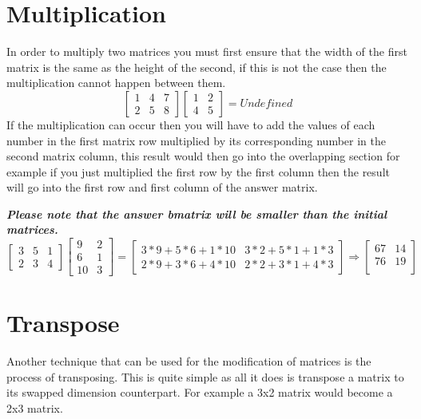 \documentclass{article}
\begin{document}
\section{Multiplication}
In order to multiply two matrices you must first ensure that the width of the first matrix is the same as the height of the second, if this is not the case then the multiplication cannot happen between them.
\begin{equation*}
	\begin{bmatrix}
		1 & 4 & 7\\
		2 & 5 & 8
	\end{bmatrix}
	\begin{bmatrix}
		1 & 2\\
		4 & 5
	\end{bmatrix}
	=
	Undefined
\end{equation*}
If the multiplication can occur then you will have to add the values of each number in the first matrix row multiplied by its corresponding number in the second matrix column, this result would then go into the overlapping section for example if you just multiplied the first row by the first column then the result will go into the first row and first column of the answer matrix.

\textit{\textbf{Please note that the answer bmatrix will be smaller than the initial matrices.}}
\begin{equation*}
	\begin{bmatrix}
		3 & 5 & 1\\
		2 & 3 & 4
	\end{bmatrix}
	\begin{bmatrix}
		9 & 2\\
		6 & 1\\
		10 & 3
	\end{bmatrix}
	=
	\begin{bmatrix}
		3*9+5*6+1*10 & 3*2+5*1+1*3\\
		2*9+3*6+4*10 & 2*2+3*1+4*3
	\end{bmatrix}
	\Rightarrow
	\begin{bmatrix}
		67 & 14\\
		76 & 19\\
	\end{bmatrix}
\end{equation*}
\section{Transpose}
Another technique that can be used for the modification of matrices is the process of transposing. This is quite simple as all it does is transpose a matrix to its swapped dimension counterpart. For example a 3x2 matrix would become a 2x3 matrix.
\end{document}
